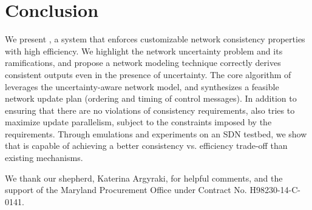 \section{Conclusion}
\label{sec:conclusion}
We present \name, a system that enforces customizable network consistency properties 
with high efficiency.
We highlight the network uncertainty problem and its ramifications, 
and propose a network modeling technique correctly derives consistent outputs even in the presence
of uncertainty.
The core algorithm of \name leverages the uncertainty-aware network model, 
and synthesizes a feasible network update plan (ordering and timing of control messages).
In addition to ensuring that there are no violations of consistency requirements,
\name also tries to maximize update parallelism, subject to the constraints imposed by the requirements.
Through emulations and experiments on an SDN testbed, 
we show that \name is capable of achieving a better consistency vs.
efficiency trade-off than existing mechanisms.

We thank our shepherd, Katerina Argyraki, for helpful comments, and the support of
the Maryland Procurement Office under Contract No. H98230-14-C-0141.




